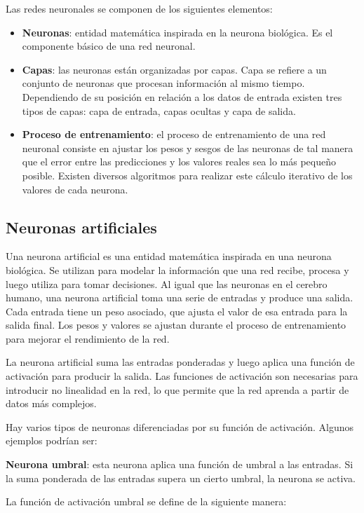 Las redes neuronales se componen de los siguientes elementos: \cite{AGGARWAL_2023}
\begin{itemize}
\tightlist
\item \textbf{Neuronas}: entidad matemática inspirada en la neurona biológica. Es el componente básico de una red neuronal. 
\item \textbf{Capas}: las neuronas están organizadas por capas. Capa se refiere a un conjunto de neuronas que procesan información al mismo tiempo. Dependiendo de su posición en relación a los datos de entrada existen tres tipos de capas: capa de entrada, capas ocultas y capa de salida.
\item \textbf{Proceso de entrenamiento}: el proceso de entrenamiento de una red neuronal consiste en ajustar los pesos y sesgos de las neuronas de tal manera que el error entre las predicciones y los valores reales sea lo más pequeño posible. Existen diversos algoritmos para realizar este cálculo iterativo de los valores de cada neurona.
\end{itemize}

\subsection{Neuronas artificiales}
Una neurona artificial es una entidad matemática inspirada en una neurona biológica. Se utilizan para modelar la información que una red recibe, procesa y luego utiliza para tomar decisiones.
Al igual que las neuronas en el cerebro humano, una neurona artificial toma una serie de entradas y produce una salida. Cada entrada tiene un peso asociado, que ajusta el valor de esa entrada para la salida final. Los pesos y valores se ajustan durante el proceso de entrenamiento para mejorar el rendimiento de la red.

La neurona artificial suma las entradas ponderadas y luego aplica una función de activación para producir la salida. Las funciones de activación son necesarias para introducir no linealidad en la red, lo que permite que la red aprenda a partir de datos más complejos.

Hay varios tipos de neuronas diferenciadas por su función de activación. Algunos ejemplos podrían ser: \cite{Baheti} \cite{Gutpa_2022}

\textbf{Neurona umbral}: esta neurona aplica una función de umbral a las entradas. Si la suma ponderada de las entradas supera un cierto umbral, la neurona se activa.

La función de activación umbral se define de la siguiente manera:

